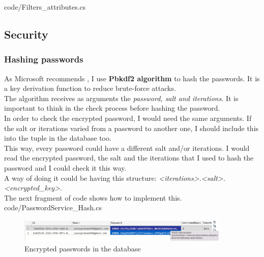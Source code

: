             
            {code/Filters_attributes.cs}

    \subsection{Security}
        \subsubsection{Hashing passwords}
            As Microsoft recommends \cite{Hash}, I use \textbf{Pbkdf2 algorithm} to hash the passwords. It is a key derivation function to reduce brute-force attacks. \\

            The algorithm receives as arguments the \textit{password, salt and iterations}. It is important to think in the check process before hashing the password. \\
            In order to check the encrypted password, I would need the same arguments. If the salt or iterations varied from a password to another one, I should include this into the tuple in the database too. \\
            
            This way, every password could have a different salt and/or iterations. I would read the encrypted password, the salt and the iterations that I used to hash the password and I could check it this way. \\
            A way of doing it could be having this structure: \textit{<iterations>.<salt>.<encrypted\_key>}. \\
            
            The next fragment of code shows how to implement this. \\

            
            {code/PasswordService_Hash.cs}

            \begin{figure}[H]
                \centering
                    \includegraphics[width=0.9\textwidth]{assets/users_database.png}
                \caption{Encrypted passwords in the database}
                \label{fig:user_database}
            \end{figure}

